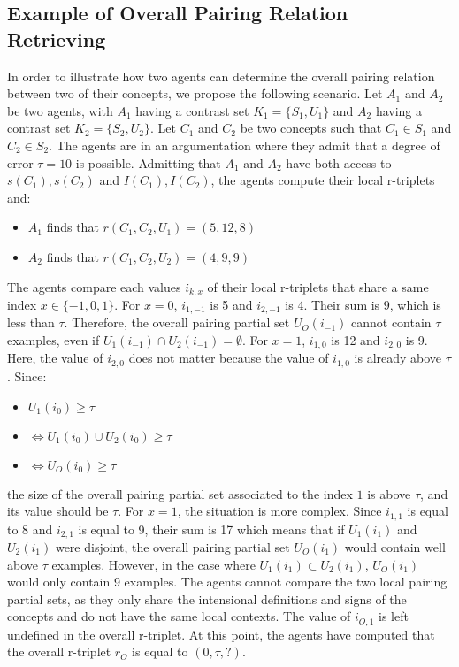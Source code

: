 \subsection{Example of Overall Pairing Relation Retrieving}

In order to illustrate how two agents can determine the overall pairing relation between two of their concepts, we propose the following scenario. Let $A_{1}$ and $A_{2}$ be two agents, with $A_{1}$ having a contrast set $K_{1} = \{S_{1}, U_{1} \}$ and $A_{2}$ having a contrast set $K_{2} = \{S_{2}, U_{2}\}$. Let $C_{1}$ and $C_{2}$ be two concepts such that $C_{1} \in S_{1}$ and $C_{2} \in S_{2}$. The agents are in an argumentation where they admit that a degree of error $\tau = 10$ is possible. Admitting that $A_{1}$ and $A_{2}$ have both access to $s(C_{1}),s(C_{2})$ and $I(C_{1}), I(C_{2})$, the agents compute their local r-triplets and:

\begin{itemize}
    \item $A_{1}$ finds that $r(C_{1},C_{2}, U_{1}) = (5,12,8)$
    \item $A_{2}$ finds that $r(C_{1},C_{2}, U_{2}) = (4,9,9)$
\end{itemize}

The agents compare each values $i_{k,x}$ of their local r-triplets that share a same index $x \in \{-1,0,1\}$. For $x = 0$, $i_{1,-1}$ is 5 and $i_{2,-1}$ is 4. Their sum is $9$, which is less than $\tau$. Therefore, the overall pairing partial set $U_{O}(i_{-1})$ cannot contain $\tau$ examples, even if $U_{1}(i_{-1}) \cap U_{2}(i_{-1}) = \emptyset$. For $x = 1$, $i_{1,0}$ is 12 and $i_{2,0}$ is 9. Here, the value of $i_{2,0}$ does not matter because the value of $i_{1,0}$ is already above $\tau$. Since:

\begin{itemize}
    \item $U_{1}(i_{0}) \geq \tau$
    \item $\Leftrightarrow U_{1}(i_{0}) \cup U_{2}(i_{0}) \geq \tau$
    \item $\Leftrightarrow U_{O}(i_{0}) \geq \tau$
\end{itemize}

the size of the overall pairing partial set associated to the index $1$ is above $\tau$, and its value should be $\tau$. For $x = 1$, the situation is more complex. Since $i_{1,1}$ is equal to 8 and $i_{2,1}$ is equal to 9, their sum is 17 which means that if $U_{1}(i_{1})$ and $U_{2}(i_{1})$ were disjoint, the overall pairing partial set $U_{O}(i_{1})$ would contain well above $\tau$ examples. However, in the case where $U_{1}(i_{1}) \subset U_{2}(i_{1})$, $U_{O}(i_{1})$ would only contain 9 examples. The agents cannot compare the two local pairing partial sets, as they only share the intensional definitions and signs of the concepts and do not have the same local contexts. The value of $i_{O,1}$ is left undefined in the overall r-triplet. At this point, the agents have computed that the overall r-triplet $r_{O}$ is equal to $(0,\tau,?)$.

